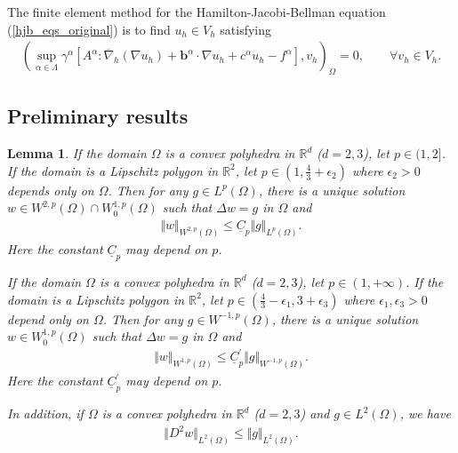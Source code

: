 \documentclass[12pt]{amsart}
\newtheorem{lemma}{Lemma}[section]
\theoremstyle{definition}
\theoremstyle{remark}
\begin{document}
The finite element method for the Hamilton-Jacobi-Bellman equation (\ref{hjb_eqs_original}) is 
to find $u_{h}\in V_{h}$ satisfying 
\begin{align}
\label{hjb_fem}
(\sup_{\alpha\in \Lambda}\gamma^{\alpha}[A^{\alpha}:\overline{\nabla}_{h}
(\nabla u_{h}) + \boldsymbol{b}^{\alpha}\cdot\nabla u_{h} 
+ c^{\alpha}u_{h} - f^{\alpha}], v_{h})_{\Omega} = 0, 
\qquad \forall v_{h} \in V_{h}.
\end{align}

\subsection{Preliminary results}
\label{sec_preliminary}

\begin{lemma}
\label{lemma_Poisson_regularity}
If the domain $\Omega$ is a convex polyhedra in $\mathbb{R}^{d}$ ($d=2,3$), 
let $p \in (1,2]$. If the domain is a Lipschitz polygon in $\mathbb{R}^{2}$, 
let $p \in (1,\frac{4}{3} + \epsilon_{2})$ where $\epsilon_{2}>0$ depends only on 
$\Omega$. Then for any $g \in L^{p}(\Omega)$, 
there is a unique solution $w \in W^{2,p}(\Omega) \cap W_{0}^{1,p}(\Omega)$ such that 
$\Delta w = g$ in $\Omega$ and 
\begin{align}
\label{Poisson_regularity_ineq1}
\Vert w\Vert_{W^{2,p}(\Omega)} \leq \underline{C}_{p} \Vert g\Vert_{L^{p}(\Omega)}.
\end{align}
Here the constant $\underline{C}_{p}$ may depend on $p$.

If the domain $\Omega$ is a convex polyhedra in $\mathbb{R}^{d}$ ($d=2,3$), 
let $p \in (1,+\infty)$. If the domain is a Lipschitz polygon in $\mathbb{R}^{2}$, 
let $p \in (\frac{4}{3} - \epsilon_{1}, 3 + \epsilon_{3})$ where $\epsilon_{1}, 
\epsilon_{3}>0$ depend only on $\Omega$. Then for any $g \in W^{-1,p}(\Omega)$, 
there is a unique solution $w \in W_{0}^{1,p}(\Omega)$ such that 
$\Delta w = g$ in $\Omega$ and 
\begin{align}
\label{Poisson_regularity_ineq2}
\Vert w\Vert_{W^{1,p}(\Omega)} \leq \underline{C}_{p}^{\prime} 
\Vert g\Vert_{W^{-1,p}(\Omega)}.
\end{align}
Here the constant $\underline{C}_{p}^{\prime}$ may depend on $p$.

In addition, if $\Omega$ is a convex polyhedra in $\mathbb{R}^{d}$ ($d=2,3$) 
and $g \in L^{2}(\Omega)$, we have 
\begin{align}
\label{Poisson_regularity_ineq3}
\Vert D^{2} w\Vert_{L^{2}(\Omega)} \leq \Vert g\Vert_{L^{2}(\Omega)}.
\end{align}
\end{lemma}
\end{document}
